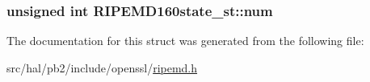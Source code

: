 \subsubsection[{\texorpdfstring{num}{num}}]{\setlength{\rightskip}{0pt plus 5cm}unsigned int R\+I\+P\+E\+M\+D160state\+\_\+st\+::num}\hypertarget{struct_r_i_p_e_m_d160state__st_acb6e5ff004459b4b8bada376dbc87014}{}\label{struct_r_i_p_e_m_d160state__st_acb6e5ff004459b4b8bada376dbc87014}


The documentation for this struct was generated from the following file\+:\begin{DoxyCompactItemize}
\item 
src/hal/pb2/include/openssl/\hyperlink{ripemd_8h}{ripemd.\+h}\end{DoxyCompactItemize}
